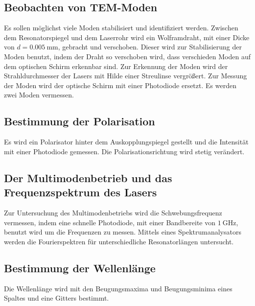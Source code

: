 \subsection{Beobachten von TEM-Moden}
\label{subsec:Moden}
Es sollen möglichst viele Moden stabilisiert und identifiziert werden. Zwischen dem Resonatorspiegel und dem Laserrohr
wird ein Wolframdraht, mit einer Dicke von $d = \qty{0.005}{\milli\meter}$, gebracht und verschoben. Dieser wird zur Stabilisierung
der Moden benutzt, indem der Draht so verschoben wird, dass verschieden Moden auf dem optischen Schirm erkennbar sind.
Zur Erkennung der Moden wird der Strahldurchmesser der Lasers mit Hilde einer Streulinse vergrößert. Zur Messung der Moden wird der optische Schirm mit 
einer Photodiode ersetzt. Es werden zwei Moden vermessen.

\subsection{Bestimmung der Polarisation}
\label{subsec:Polarisation}
Es wird ein Polarisator hinter dem Auskopplungspiegel gestellt und die Intensität mit einer Photodiode gemessen.
Die Polarisationsrichtung wird stetig verändert.

\subsection{Der Multimodenbetrieb und das Frequenzspektrum des Lasers}
\label{subsec:Multimodenbetrieb}
Zur Untersuchung des Multimodenbetriebs wird die Schwebungsfrequenz vermessen, indem eine schnelle Photodiode, mit einer Bandbereite
von $\qty{1}{\giga\Hz}$, benutzt wird um die Frequenzen zu messen. Mittels eines Spektrumanalysators werden die Fourierspektren für 
unterschiedliche Resonatorlängen untersucht.

\subsection{Bestimmung der Wellenlänge}
\label{subsec:Wellenlänge}
Die Wellenlänge wird mit den Beugungsmaxima und Beugungsminima eines Spaltes und eine Gitters bestimmt.